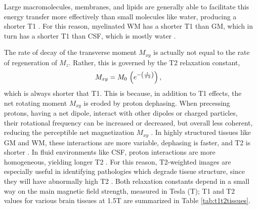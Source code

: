 Large macromolecules, membranes, and lipids are generally able to facilitate this energy transfer more effectively than small molecules like water, producing a shorter T1 \cite{Koenig1990}.
For this reason, myelinated WM has a shorter T1 than GM, which in turn has a shorter T1 than CSF, which is mostly water \cite{Roberts2007}.
\par
The rate of decay of the transverse moment $M_{xy}$ is actually not equal to the rate of regeneration of $M_z$.
Rather, this is governed by the T2 relaxation constant,
\begin{equation}
M_{xy} = M_0\thinspace\left(e^{-\left(\frac{t}{T2}\right)}\right)\label{eq:T2},
\end{equation}
which is always shorter that T1.
This is because, in addition to T1 effects, the net rotating moment $M_{xy}$ is eroded by proton dephasing.
When precessing protons, having a net dipole, interact with other dipoles or charged particles, their rotational frequency can be increased or decreased, but overall less coherent, reducing the perceptible net magnetization $M_{xy}$ \cite{Bloch1946}.
In highly structured tissues like GM and WM, these interactions are more variable, dephasing is faster, and T2 is shorter \cite{Roberts2007}.
In fluid environments like CSF, proton interactions are more homogeneous, yielding longer T2 \cite{Roberts2007}.
For this reason, T2-weighted images are especially useful in identifying pathologies which degrade tissue structure, since they will have abnormally high T2 \cite{Roberts2007}.
Both relaxation constants depend in a small way on the main magnetic field strength, measured in Tesla (T); T1 and T2 values for various brain tissues at 1.5T are summarized in Table \ref{tab:t1t2tissues}.
\par
\begin{table}
  \caption{T1 and T2 constants for brain tissues at 1.5 Tesla.}
  \label{tab:t1t2tissues}
\end{table}
